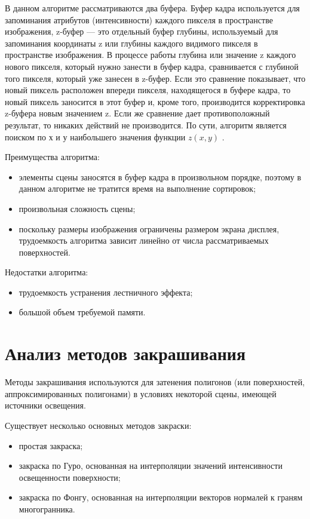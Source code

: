 В данном алгоритме рассматриваются два буфера. Буфер кадра используется для запоминания атрибутов (интенсивности) каждого пикселя в пространстве изображения, z-буфер --- это отдельный буфер глубины, используемый для запоминания координаты z или глубины каждого видимого пикселя в пространстве изображения. В процессе работы глубина или значение z каждого нового пикселя, который нужно занести в буфер кадра, сравнивается с глубиной того пикселя, который уже занесен в z-буфер. Если это сравнение показывает, что новый пиксель расположен впереди пикселя, находящегося в буфере кадра, то новый пиксель заносится в этот буфер и, кроме того, производится корректировка z-буфера новым значением z. Если же сравнение дает противоположный результат, то никаких действий не производится. По сути, алгоритм является поиском по х и у наибольшего значения функции $z(x, y)$ \cite{demin}.

Преимущества алгоритма:
\begin{itemize}
	\item элементы сцены заносятся в буфер кадра в произвольном порядке, поэтому в данном алгоритме не тратится время на выполнение сортировок;
	\item произвольная сложность сцены;
	\item поскольку размеры изображения ограничены размером экрана дисплея, трудоемкость алгоритма зависит линейно от числа рассматриваемых поверхностей.
\end{itemize}

Недостатки алгоритма:
\begin{itemize}
	\item трудоемкость устранения лестничного эффекта;
	\item большой объем требуемой памяти.
\end{itemize}


\section{Анализ методов закрашивания}

Методы закрашивания используются для затенения полигонов (или поверхностей, аппроксимированных полигонами) в условиях некоторой сцены, имеющей источники освещения.

Существует несколько основных методов закраски:
\begin{itemize}
	\item простая закраска;
	\item закраска по Гуро, основанная на интерполяции значений интенсивности освещенности поверхности;
	\item закраска по Фонгу, основанная на интерполяции векторов нормалей к граням многогранника.
\end{itemize}


